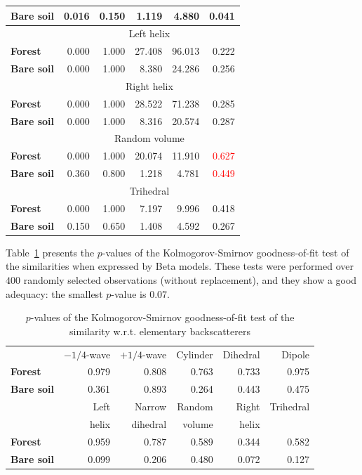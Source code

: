 \documentclass[conference]{IEEEtran}
\begin{document}
\begin{table}[hbt]
\begin{tabular}{lrrrrr}
\textbf{Bare soil} & 0.016 & 0.150 & 1.119 & 4.880 & 0.041\\
\midrule
%
& \multicolumn{5}{c}{Left helix}\\
\cmidrule(lr){2-6}
\textbf{Forest} & 0.000 & 1.000 & 27.408 & 96.013 & 0.222\\
\textbf{Bare soil} & 0.000 & 1.000 & 8.380 & 24.286 & 0.256\\
\midrule
& \multicolumn{5}{c}{Right helix}\\
\cmidrule(lr){2-6}
\textbf{Forest} & 0.000 & 1.000 & 28.522 & 71.238 & 0.285\\
\textbf{Bare soil} & 0.000 & 1.000 & 8.316 & 20.574 & 0.287\\
\midrule
%
& \multicolumn{5}{c}{Random volume}\\
\cmidrule(lr){2-6}
\textbf{Forest} & 0.000 & 1.000 & 20.074 & 11.910 & \textcolor{red}{0.627}\\
\textbf{Bare soil} & 0.360 & 0.800 & 1.218 & 4.781 & \textcolor{red}{0.449}\\
\midrule
%
& \multicolumn{5}{c}{Trihedral}\\
\cmidrule(lr){2-6}
\textbf{Forest} & 0.000 & 1.000 & 7.197 & 9.996 & 0.418\\
\textbf{Bare soil} & 0.150 & 0.650 & 1.408 & 4.592 & 0.267\\
\bottomrule
\end{tabular}
\end{table}

Table~\ref{tab:pvalues_table} presents the $p$-values of the Kolmogorov-Smirnov goodness-of-fit test of the similarities when expressed by Beta models.
These tests were performed over $400$ randomly selected observations (without replacement), and they show a good adequacy: the smallest $p$-value is $0.07$.

\begin{table}[hbt]
\centering
\caption{$p$-values of the Kolmogorov-Smirnov goodness-of-fit test of the similarity w.r.t. elementary backscatterers}\label{tab:pvalues_table}
\begin{tabular}{lrrrrr}
\toprule
& $-1/4$-wave & $+1/4$-wave & Cylinder & Dihedral & Dipole\\
\cmidrule(lr){2-6}
\textbf{Forest} & 0.979 & 0.808 & 0.763 & 0.733 & 0.975\\
\textbf{Bare soil} & 0.361 & 0.893 & 0.264 & 0.443 & 0.475\\
\midrule
& Left & Narrow & Random & Right & Trihedral\\
             & helix & dihedral & volume & helix & \\
\cmidrule(lr){2-6}
\textbf{Forest} & 0.959 & 0.787 & 0.589 & 0.344 & 0.582\\
\textbf{Bare soil} & 0.099 & 0.206 & 0.480 & 0.072 & 0.127\\
\bottomrule
\end{tabular} 
\end{table}
\end{document}
